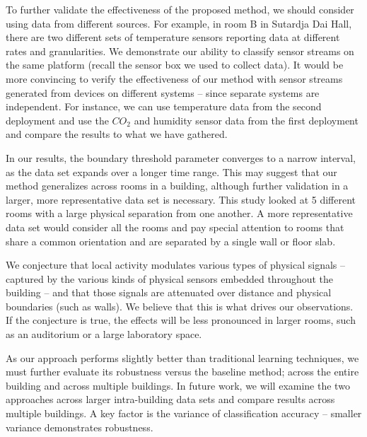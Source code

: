 To further validate the effectiveness of the proposed method, we should consider using data from different sources.
For example, in room B in Sutardja Dai Hall, there are two different sets of temperature sensors reporting data at different rates and granularities.
We demonstrate our ability to classify sensor streams on the same platform (recall the sensor box we used to collect data). 
It would be more convincing to verify the effectiveness of our method with sensor streams generated from devices on
 different systems -- since separate systems are independent.  For instance, we can use temperature data from the second deployment 
 and use the $CO_{2}$ and humidity sensor data from the first deployment and compare the results to what we have gathered.

In our results, the boundary threshold parameter converges to a narrow interval, as the data set expands 
over a longer time range.  This may suggest that our method generalizes across rooms in a building, although further validation in a 
larger, more representative data set is necessary.  This study looked at 5 different rooms with a large physical separation from one
another.  A more representative data set would consider all the rooms and pay special attention to rooms that share a common orientation
and are separated by a single wall or floor slab.
  
We conjecture that local activity modulates various types of physical 
signals -- captured by the various kinds of physical sensors embedded
throughout the building -- and that those signals are attenuated
over distance and physical boundaries (such as walls).  We believe that this is what drives our observations. 
If the conjecture is true, the effects will be less pronounced in larger rooms, such as an auditorium or a large laboratory space.


As our approach performs slightly better than traditional learning techniques, we must further evaluate its robustness
versus the baseline method; across the entire building and across multiple buildings.  In future work, we will examine the 
two approaches across larger intra-building data sets and compare results across multiple buildings.
A key factor is the variance of classification accuracy -- smaller variance demonstrates robustness.  

